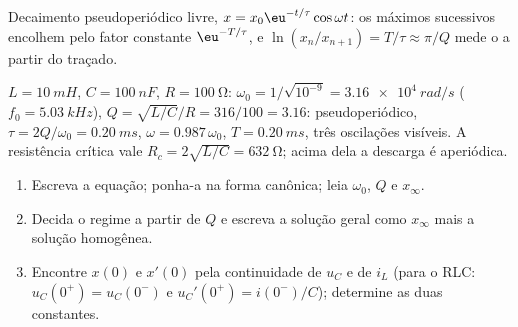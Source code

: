 \begin{omfigure}

{\small Decaimento pseudoperiódico livre, $x = x_0\eu^{-t/\tau}\cos\omega t$:
os máximos sucessivos encolhem pelo fator constante $\eu^{-T/\tau}$, e
$\ln(x_n/x_{n+1}) = T/\tau \approx \pi/Q$ mede o 
a partir do traçado.}
\end{omfigure}

\begin{example}\label{ex:b1:transient-regimes:rlcnum}
$L = \qty{10}{mH}$, $C = \qty{100}{nF}$, $R = \qty{100}{\ohm}$:
$\omega_0 = 1/\sqrt{10^{-9}} = \qty{3.16e4}{rad/s}$ ($f_0 =
\qty{5.03}{kHz}$), $Q = \sqrt{L/C}/R = 316/100 = 3.16$: pseudoperiódico,
$\tau = 2Q/\omega_0 = \qty{0.20}{ms}$, $\omega = 0.987\,\omega_0$,
$T = \qty{0.20}{ms}$, três oscilações visíveis. A resistência crítica
vale $R_c = 2\sqrt{L/C} = \qty{632}{\ohm}$; acima dela a descarga é
aperiódica.
\end{example}

\begin{method}\label{met:b1:transient-regimes:second}
\begin{enumerate}
  \item Escreva a equação; ponha-a na forma canônica; leia $\omega_0$,
        $Q$ e $x_\infty$.
  \item Decida o regime a partir de $Q$ e escreva a solução geral como
        $x_\infty$ mais a solução homogênea.
  \item Encontre $x(0)$ e $x'(0)$ pela continuidade de $u_C$ e de $i_L$
        (para o RLC: $u_C(0^+) = u_C(0^-)$ e $u_C'(0^+) = i(0^-)/C$);
        determine as duas constantes.
\end{enumerate}
\end{method}

